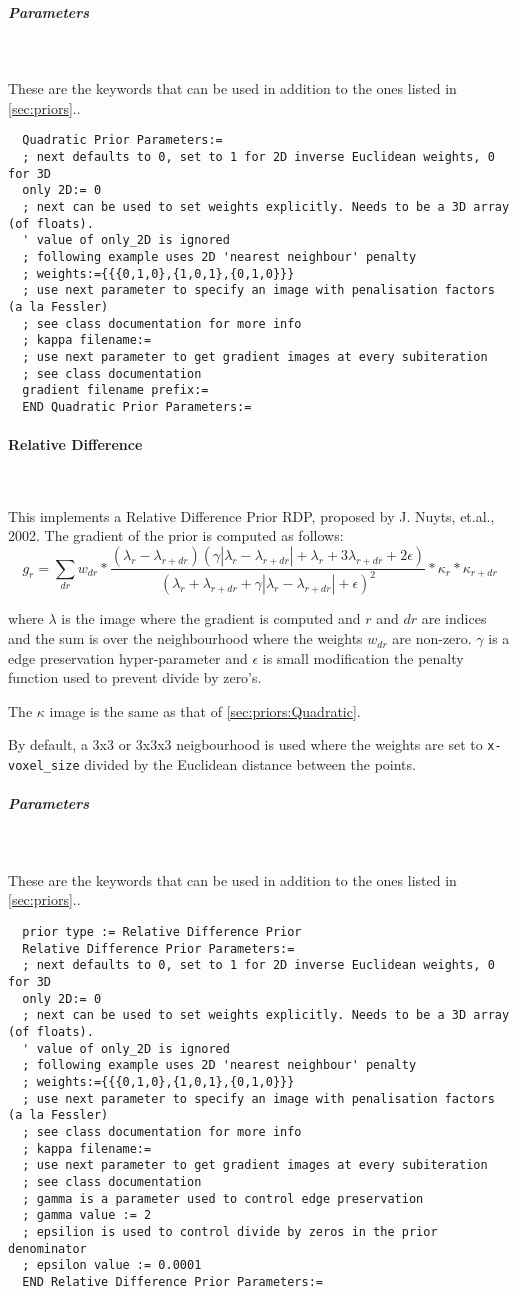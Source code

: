 \documentclass{article}
\newcommand{\subsubsubsection}[1]{\paragraph{#1}\mbox{} \\}
\newcommand{\subsubsubsubsection}[1]{\subparagraph{#1} \mbox{} \\}
\begin{document}
{{{ \subsubsubsubsection{Parameters}
}
  These are the keywords that can be used in addition to the ones listed in \ref{sec:priors}..
  \begin{verbatim}
  Quadratic Prior Parameters:=
  ; next defaults to 0, set to 1 for 2D inverse Euclidean weights, 0 for 3D 
  only 2D:= 0
  ; next can be used to set weights explicitly. Needs to be a 3D array (of floats).
  ' value of only_2D is ignored
  ; following example uses 2D 'nearest neighbour' penalty
  ; weights:={{{0,1,0},{1,0,1},{0,1,0}}}
  ; use next parameter to specify an image with penalisation factors (a la Fessler)
  ; see class documentation for more info
  ; kappa filename:=
  ; use next parameter to get gradient images at every subiteration
  ; see class documentation
  gradient filename prefix:= 
  END Quadratic Prior Parameters:=
  \end{verbatim}


{ \subsubsubsection{Relative Difference} \label{sec:priors:Relative_Difference}
}
This implements a Relative Difference Prior RDP, proposed by J. Nuyts, et.al., 2002. The gradient of the prior is computed as follows:
  \[g_r = \sum_{dr} w_{dr} *
  \frac{\left(\lambda_{r}-\lambda_{r+dr}\right)\left(\gamma\left|\lambda_{r}-\lambda_{r+dr}\right|+\lambda_{r}+3 \lambda_{r+dr} + 2 \epsilon \right)}
  {\left(\lambda_{r}+\lambda_{r+dr}+\gamma\left|\lambda_{r}-\lambda_{r+dr}\right| + \epsilon \right)^{2}} *
  \kappa_r * \kappa_{r+dr}\]

  \noindent where $\lambda$ is the image where the gradient is computed
   and $r$ and $dr$ are indices and the sum
  is over the neighbourhood where the weights $w_{dr}$ are non-zero.
  $\gamma$ is a edge preservation hyper-parameter and $\epsilon$ is small 
  modification the penalty function used to prevent divide by zero's.

  The $\kappa$ image is the same as that of \ref{sec:priors:Quadratic}.

  By default, a 3x3 or 3x3x3 neigbourhood is used where the weights are set to 
  \texttt{x-voxel\_size} divided by the Euclidean distance between the points.
 
{ \subsubsubsubsection{Parameters}
}
  These are the keywords that can be used in addition to the ones listed in \ref{sec:priors}..
  \begin{verbatim}
  prior type := Relative Difference Prior
  Relative Difference Prior Parameters:=
  ; next defaults to 0, set to 1 for 2D inverse Euclidean weights, 0 for 3D 
  only 2D:= 0
  ; next can be used to set weights explicitly. Needs to be a 3D array (of floats).
  ' value of only_2D is ignored
  ; following example uses 2D 'nearest neighbour' penalty
  ; weights:={{{0,1,0},{1,0,1},{0,1,0}}}
  ; use next parameter to specify an image with penalisation factors (a la Fessler)
  ; see class documentation for more info
  ; kappa filename:=
  ; use next parameter to get gradient images at every subiteration
  ; see class documentation
  ; gamma is a parameter used to control edge preservation
  ; gamma value := 2
  ; epsilion is used to control divide by zeros in the prior denominator
  ; epsilon value := 0.0001
  END Relative Difference Prior Parameters:=
  \end{verbatim}


}}
\end{document}
